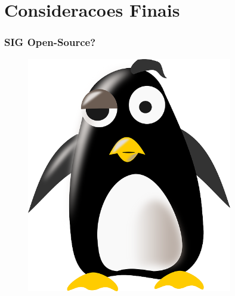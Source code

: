 \documentclass[hyperref={pdfpagelabels=true}]{beamer}
\begin{document}



\section{Consideracoes Finais} 

\begin{frame}
\frametitle{SIG Open-Source?}

        \begin{figure}   
            \includegraphics[width=0.8\textwidth]{tux.png}
        \end{figure} 

\end{frame}
\end{document}
